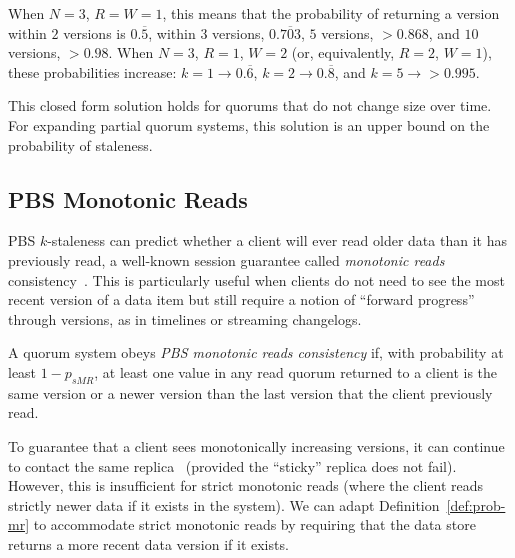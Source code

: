 \documentclass{vldb}
\newcommand{\subsectionskip}{-0em}
\begin{document}
When $N$$=$$3$, $R$$=$$W$$=$$1$, this means that the probability of
returning a version within $2$ versions is $0.\overline{5}$, within $3$
versions, $0.\overline{703}$, $5$ versions, $> 0.868$, and $10$
versions, $>0.98$.  When $N$$=$$3$, $R$$=$$1$, $W$$=$$2$ (or, equivalently,
$R$$=$$2$, $W$$=$$1$), these probabilities increase: $k$$=$$1
\rightarrow 0.\overline{6}$, $k$$=$$2 \rightarrow 0.\overline{8}$, and
$k$$=$$5 \rightarrow > 0.995$.

This closed form solution holds for quorums that do not change size
over time.  For expanding partial quorum systems, this solution is an
upper bound on the probability of staleness.

\vspace{\subsectionskip}\subsection{PBS Monotonic Reads}

PBS $k$-staleness can predict whether a client will ever read older
data than it has previously read, a well-known session guarantee
called \textit{monotonic reads} consistency~\cite{sessionguarantees}.
This is particularly useful when clients do not need to see the most
recent version of a data item but still require a notion of ``forward
progress'' through versions, as in timelines or streaming changelogs.

\begin{definition}
\label{def:prob-mr}
A quorum system obeys \textit{PBS monotonic reads consistency} if,
with probability at least $1-p_{sMR}$, at least one value in any
read quorum returned to a client is the same version or a newer
version than the last version that the client previously read.
\end{definition}

To guarantee that a client sees monotonically increasing versions, it
can continue to contact the same replica~\cite{vogels-defs} (provided
the ``sticky'' replica does not fail).  However, this is insufficient
for strict monotonic reads (where the client reads strictly newer data
if it exists in the system).  We can adapt
Definition~\ref{def:prob-mr} to accommodate strict monotonic reads by
requiring that the data store returns a more recent data version if it exists.
\end{document}
